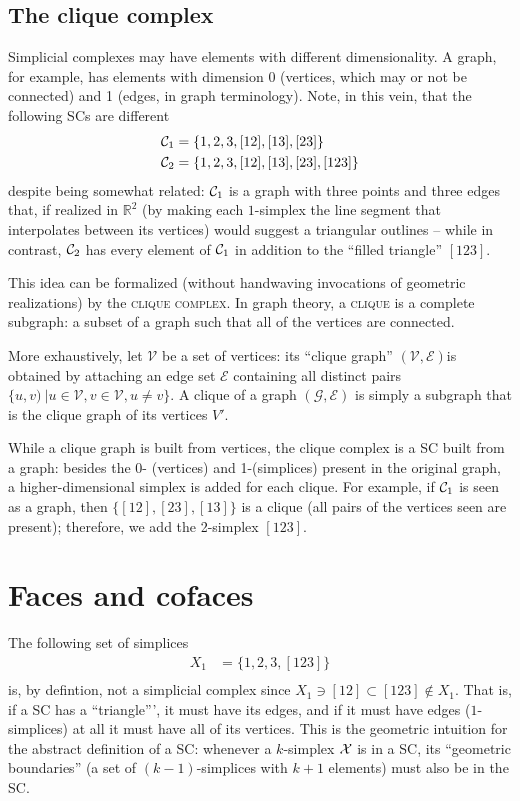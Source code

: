 \documentclass{tufte-handout}
\newcommand{\re}{\mathbb{R}}
\begin{document}
\subsection{The clique complex}
Simplicial complexes may have elements with different dimensionality. A graph, for example, has elements with dimension 0 (vertices, which may or not be connected) and 1 (edges, in graph terminology). Note, in this vein, that the following SCs are different
\begin{align*}
    \sc_1 &= \{1,2,3,[12],[13],[23]\}\\
    \sc_2 &= \{1,2,3,[12],[13],[23],[123]\}
\end{align*}
despite being somewhat related: $\sc_1$ is a graph with three points and three edges that, if realized in $\re^2$ (by making each $1$-simplex the line segment that interpolates between its vertices) would suggest a triangular outlines -- while in contrast, $\sc_2$ has every element of $\sc_1$ in addition to the ``filled triangle'' $[123]$. 

This idea can be formalized (without handwaving invocations of geometric realizations) by the \textsc{clique complex}. In graph theory, a \textsc{clique} is a complete subgraph: a subset of a graph such that all of the vertices are connected. 

More exhaustively,  let  $\mathcal V$ be a set of vertices: its ``clique graph'' $(\mathcal V, \mathcal E)$is obtained by attaching an edge set $\mathcal E$ containing all distinct pairs $\{u,v)\ | u\in \mathcal V, v \in \mathcal V, u\neq v\}$. A clique of a graph $(\mathcal G, \mathcal E)$ is simply a subgraph that is the clique graph of its vertices $V'$. 

While a clique graph is built from vertices, the clique complex is a SC built from a graph: besides the 0- (vertices) and 1-(simplices) present in the original graph, a higher-dimensional simplex is added for each clique. For example, if $\sc_1$ is seen as a graph, then  $\{[12],[23],[13]\}$ is a clique (all pairs of the vertices seen are present); therefore, we add the 2-simplex $[123]$. 


\section{Faces and cofaces}
The following set of simplices
\begin{align*}
    X_1 &= \{1,2,3,[123]\}\\
\end{align*}
is, by defintion, not a simplicial complex since $X_1 \ni [12]\subset [123]\not \in X_1$. That is,
if a SC has a ``triangle''', it must have its edges, and if it must have edges ($1$-simplices) at all it must have all of its vertices. This is the geometric intuition for the abstract definition of a SC:  whenever a $k$-simplex $\se$ is in a SC, its ``geometric boundaries'' (a set of $(k-1)$-simplices with $k+1$ elements) must also be in the SC. 
\end{document}
